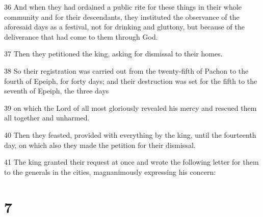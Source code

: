 \par 36 And when they had ordained a public rite for these things in their whole community and for their descendants, they instituted the observance of the aforesaid days as a festival, not for drinking and gluttony, but because of the deliverance that had come to them through God.
\par 37 Then they petitioned the king, asking for dismissal to their homes.
\par 38 So their registration was carried out from the twenty-fifth of Pachon to the fourth of Epeiph, for forty days; and their destruction was set for the fifth to the seventh of Epeiph, the three days
\par 39 on which the Lord of all most gloriously revealed his mercy and rescued them all together and unharmed.
\par 40 Then they feasted, provided with everything by the king, until the fourteenth day, on which also they made the petition for their dismissal.
\par 41 The king granted their request at once and wrote the following letter for them to the generals in the cities, magnanimously expressing his concern:

\chapter{7}

